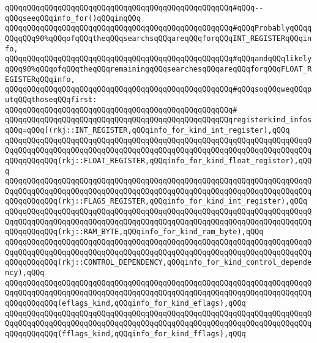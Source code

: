 \verb|qQQqqQQqqQQqqQQqqQQqqQQqqQQqqQQqqQQqqQQqqQQqqQQqqQQq#qQQq--qQQqseeqQQqinfo_for()qQQqinqQQq|\newline
\verb|qQQqqQQqqQQqqQQqqQQqqQQqqQQqqQQqqQQqqQQqqQQqqQQqqQQq#qQQqProbablyqQQqqQQqqQQq90%qQQqofqQQqtheqQQqsearchsqQQqareqQQqforqQQqINT_REGISTERqQQqinfo,|\newline
\verb|qQQqqQQqqQQqqQQqqQQqqQQqqQQqqQQqqQQqqQQqqQQqqQQqqQQq#qQQqandqQQqlikelyqQQq90%qQQqofqQQqtheqQQqremainingqQQqsearchesqQQqareqQQqforqQQqFLOAT_REGISTERqQQqinfo,|\newline
\verb|qQQqqQQqqQQqqQQqqQQqqQQqqQQqqQQqqQQqqQQqqQQqqQQqqQQq#qQQqsoqQQqweqQQqputqQQqthoseqQQqfirst:|\newline
\verb|qQQqqQQqqQQqqQQqqQQqqQQqqQQqqQQqqQQqqQQqqQQqqQQqqQQq#|\newline
\verb|qQQqqQQqqQQqqQQqqQQqqQQqqQQqqQQqqQQqqQQqqQQqqQQqqQQqregisterkind_infosqQQq=qQQq[(rkj::INT_REGISTER,qQQqinfo_for_kind_int_register),qQQq|\newline
\verb|qQQqqQQqqQQqqQQqqQQqqQQqqQQqqQQqqQQqqQQqqQQqqQQqqQQqqQQqqQQqqQQqqQQqqQQqqQQqqQQqqQQqqQQqqQQqqQQqqQQqqQQqqQQqqQQqqQQqqQQqqQQqqQQqqQQqqQQqqQQqqQQqqQQqqQQq(rkj::FLOAT_REGISTER,qQQqinfo_for_kind_float_register),qQQq|\newline
\verb|qQQqqQQqqQQqqQQqqQQqqQQqqQQqqQQqqQQqqQQqqQQqqQQqqQQqqQQqqQQqqQQqqQQqqQQqqQQqqQQqqQQqqQQqqQQqqQQqqQQqqQQqqQQqqQQqqQQqqQQqqQQqqQQqqQQqqQQqqQQqqQQqqQQqqQQq(rkj::FLAGS_REGISTER,qQQqinfo_for_kind_int_register),qQQq|\newline
\verb|qQQqqQQqqQQqqQQqqQQqqQQqqQQqqQQqqQQqqQQqqQQqqQQqqQQqqQQqqQQqqQQqqQQqqQQqqQQqqQQqqQQqqQQqqQQqqQQqqQQqqQQqqQQqqQQqqQQqqQQqqQQqqQQqqQQqqQQqqQQqqQQqqQQqqQQq(rkj::RAM_BYTE,qQQqinfo_for_kind_ram_byte),qQQq|\newline
\verb|qQQqqQQqqQQqqQQqqQQqqQQqqQQqqQQqqQQqqQQqqQQqqQQqqQQqqQQqqQQqqQQqqQQqqQQqqQQqqQQqqQQqqQQqqQQqqQQqqQQqqQQqqQQqqQQqqQQqqQQqqQQqqQQqqQQqqQQqqQQqqQQqqQQqqQQq(rkj::CONTROL_DEPENDENCY,qQQqinfo_for_kind_control_dependency),qQQq|\newline
\verb|qQQqqQQqqQQqqQQqqQQqqQQqqQQqqQQqqQQqqQQqqQQqqQQqqQQqqQQqqQQqqQQqqQQqqQQqqQQqqQQqqQQqqQQqqQQqqQQqqQQqqQQqqQQqqQQqqQQqqQQqqQQqqQQqqQQqqQQqqQQqqQQqqQQqqQQq(eflags_kind,qQQqinfo_for_kind_eflags),qQQq|\newline
\verb|qQQqqQQqqQQqqQQqqQQqqQQqqQQqqQQqqQQqqQQqqQQqqQQqqQQqqQQqqQQqqQQqqQQqqQQqqQQqqQQqqQQqqQQqqQQqqQQqqQQqqQQqqQQqqQQqqQQqqQQqqQQqqQQqqQQqqQQqqQQqqQQqqQQqqQQq(fflags_kind,qQQqinfo_for_kind_fflags),qQQq|\newline
